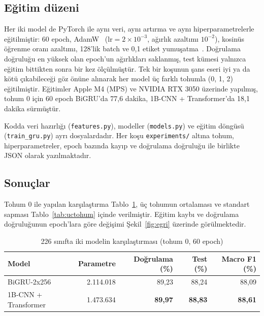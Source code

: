 \subsection{Eğitim düzeni}

Her iki model de PyTorch ile aynı veri, aynı artırma ve aynı hiperparametrelerle
eğitilmiştir: 60 epoch, AdamW~\cite{Loshchilov2019} ($\text{lr}=2\times10^{-3}$,
ağırlık azaltımı $10^{-2}$), kosinüs öğrenme oranı azaltımı, 128'lik batch ve 0,1
etiket yumuşatma~\cite{Szegedy2016}. Doğrulama doğruluğu en yüksek olan epoch'un
ağırlıkları saklanmış, test kümesi yalnızca eğitim bittikten sonra bir kez ölçülmüştür.
Tek bir koşunun şans eseri iyi ya da kötü çıkabileceği göz önüne alınarak her model
üç farklı tohumla (0, 1, 2) eğitilmiştir. Eğitimler Apple M4 (MPS) ve NVIDIA RTX 3050
üzerinde yapılmış, tohum 0 için 60 epoch BiGRU'da 77,6 dakika, 1B-CNN + Transformer'da
18,1 dakika sürmüştür.

Kodda veri hazırlığı (\texttt{features.py}), modeller (\texttt{models.py}) ve eğitim
döngüsü (\texttt{train\_gru.py}) ayrı dosyalardadır. Her koşu
\texttt{experiments/} altına tohum, hiperparametreler, epoch bazında kayıp ve
doğrulama doğruluğu ile birlikte JSON olarak yazılmaktadır.

\subsection{Sonuçlar}

Tohum 0 ile yapılan karşılaştırma Tablo~\ref{tab:tohum0}, üç tohumun ortalaması ve
standart sapması Tablo~\ref{tab:uctohum} içinde verilmiştir. Eğitim kaybı ve doğrulama
doğruluğunun epoch'lara göre değişimi Şekil~\ref{fig:egri} üzerinde görülmektedir.

\begin{table}[H]
\centering
\caption{226 sınıfta iki modelin karşılaştırması (tohum 0, 60 epoch)}
\label{tab:tohum0}
\small
\begin{tabular}{@{}lrrrr@{}}
\toprule
\textbf{Model} & \textbf{Parametre} & \textbf{Doğrulama (\%)} & \textbf{Test (\%)} & \textbf{Macro F1 (\%)} \\
\midrule
BiGRU-2x256 & 2.114.018 & 89,23 & 88,24 & 88,09 \\
1B-CNN + Transformer & 1.473.634 & \textbf{89,97} & \textbf{88,83} & \textbf{88,61} \\
\bottomrule
\end{tabular}
\end{table}

